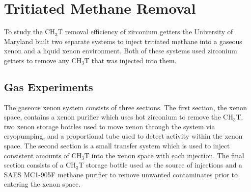 \section{Tritiated Methane Removal}
\label{sec:RD}

To study the CH$_3$T removal efficiency of zirconium getters the University of Maryland built two separate systems to inject tritiated methane into a gaseous xenon and a liquid xenon environment.  Both of these systems used zirconium getters to remove any CH$_3$T that was injected into them.

\subsection{Gas Experiments}

The gaseous xenon system consists of three sections.  The first section, the xenon space, contains a xenon purifier which uses hot zirconium to remove the CH$_3$T, two xenon storage bottles used to move xenon through the system via cryopumping, and a proportional tube used to detect activity within the xenon space.  The second section is a small transfer system which is used to inject consistent amounts of CH$_3$T into the xenon space with each injection.  The final section consists of a CH$_3$T storage bottle used as the source of injections and a SAES MC1-905F methane purifier to remove unwanted contaminates prior to entering the xenon space.



